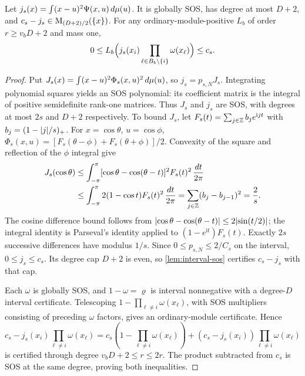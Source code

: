 \begin{lemma}\label{lem:ext-displacement}
Let $j_s(x)=\int(x-u)^2\Psi(x,u)\,d\mu(u)$. It is globally SOS,
has degree at most $D+2$, and
$c_s-j_s\in\mathrm{M}_{(D+2)/2}(\{x\})$. For any ordinary-module-positive
$L_b$ of order $r\ge v_bD+2$ and mass one,
\[
 0\le L_b\Bigl(j_s(x_i)\prod_{\ell\in B_b\setminus\{i\}}
 \omega(x_\ell)\Bigr)\le c_s.
\]
\end{lemma}
\begin{proof}
Put $J_s(x)=\int(x-u)^2\Phi_s(x,u)^2\,d\mu(u)$, so
$j_s=p_{s,N}J_s$. Integrating polynomial squares yields an SOS polynomial:
its coefficient matrix is the integral of positive semidefinite rank-one
matrices. Thus $J_s$ and $j_s$ are SOS, with degrees at most $2s$ and
$D+2$ respectively. To bound $J_s$, let
$F_s(t)=\sum_{j\in\mathbb{Z}}b_je^{\mathrm{i}jt}$ with
$b_j=(1-\lvert j\rvert/s)_+$. For $x=\cos\theta$, $u=\cos\phi$,
$\Phi_s(x,u)=[F_s(\theta-\phi)+F_s(\theta+\phi)]/2$.
Convexity of the square and reflection of the $\phi$ integral give
\begin{align*}
 J_s(\cos\theta)
 &\le\int_{-\pi}^{\pi}
 [\cos\theta-\cos(\theta-t)]^2F_s(t)^2\,\frac{dt}{2\pi}\\
 &\le\int_{-\pi}^{\pi}2(1-\cos t)F_s(t)^2\,\frac{dt}{2\pi}
 =\sum_{j\in\mathbb{Z}}(b_j-b_{j-1})^2=\frac2s.
\end{align*}
The cosine difference bound follows from
$\lvert \cos\theta-\cos(\theta-t)\rvert\le2\lvert \sin(t/2)\rvert$;
the integral identity is Parseval's identity applied to
$(1-e^{\mathrm{i}t})F_s(t)$. Exactly $2s$ successive differences have
modulus $1/s$. Since $0\le p_{s,N}\le2/C_s$ on the interval,
$0\le j_s\le c_s$. Its degree cap $D+2$ is even, so
\cref{lem:interval-sos} certifies $c_s-j_s$ with that cap.

Each $\omega$ is globally SOS, and $1-\omega=\varrho$ is interval
nonnegative with a degree-$D$ interval certificate. Telescoping
$1-\prod_{\ell\ne i}\omega(x_\ell)$, with SOS multipliers consisting of
preceding $\omega$ factors, gives an ordinary-module certificate. Hence
\[
 c_s-j_s(x_i)\prod_{\ell\ne i}\omega(x_\ell)
 =c_s(1-\prod_{\ell\ne i}\omega(x_\ell))
 +(c_s-j_s(x_i))\prod_{\ell\ne i}\omega(x_\ell)
\]
is certified through degree $v_bD+2\le r\le2r$. The product subtracted
from $c_s$ is SOS at the same degree, proving both inequalities.
\end{proof}


